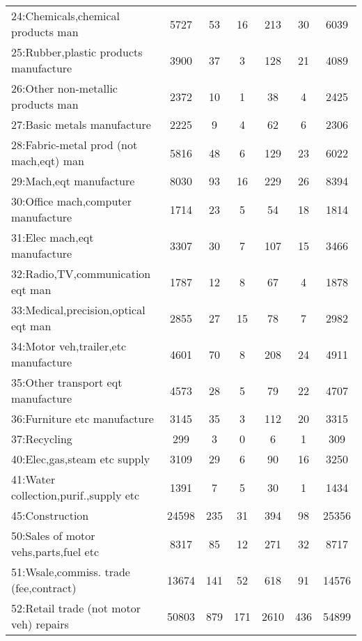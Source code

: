 {\begin{longtable}{l*{6}{c}}
24:Chemicals,chemical products man&     5727&       53&       16&      213&       30&     6039\\
25:Rubber,plastic products manufacture&     3900&       37&        3&      128&       21&     4089\\
26:Other non-metallic products man&     2372&       10&        1&       38&        4&     2425\\
27:Basic metals manufacture&     2225&        9&        4&       62&        6&     2306\\
28:Fabric-metal prod (not mach,eqt) man&     5816&       48&        6&      129&       23&     6022\\
29:Mach,eqt manufacture&     8030&       93&       16&      229&       26&     8394\\
30:Office mach,computer manufacture&     1714&       23&        5&       54&       18&     1814\\
31:Elec mach,eqt manufacture&     3307&       30&        7&      107&       15&     3466\\
32:Radio,TV,communication eqt man&     1787&       12&        8&       67&        4&     1878\\
33:Medical,precision,optical eqt man&     2855&       27&       15&       78&        7&     2982\\
34:Motor veh,trailer,etc manufacture&     4601&       70&        8&      208&       24&     4911\\
35:Other transport eqt manufacture&     4573&       28&        5&       79&       22&     4707\\
36:Furniture etc manufacture&     3145&       35&        3&      112&       20&     3315\\
37:Recycling&      299&        3&        0&        6&        1&      309\\
40:Elec,gas,steam etc supply&     3109&       29&        6&       90&       16&     3250\\
41:Water collection,purif.,supply etc&     1391&        7&        5&       30&        1&     1434\\
45:Construction&    24598&      235&       31&      394&       98&    25356\\
50:Sales of motor vehs,parts,fuel etc&     8317&       85&       12&      271&       32&     8717\\
51:Wsale,commiss. trade (fee,contract)&    13674&      141&       52&      618&       91&    14576\\
52:Retail trade (not motor veh) repairs&    50803&      879&      171&     2610&      436&    54899\\

\end{longtable}}
